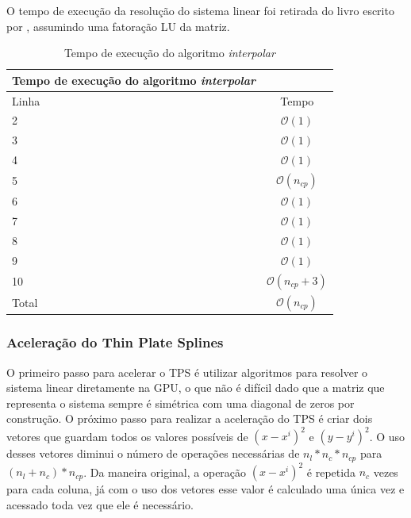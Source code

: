   O tempo de execução da resolução do sistema linear foi retirada do livro escrito por 
\cite[Part~IV]{trefethen1997numerical}, assumindo uma fatoração LU da matriz.

\begin{table}[H]
\begin{center}
\begin{tabular}{l|c}
\hline
Tempo de execução do algoritmo \textit{interpolar} \\
\hline
Linha&Tempo\\
\hline
2       &$\mathcal{O}(1)$ \\
3       &$\mathcal{O}(1)$ \\
4       &$\mathcal{O}(1)$\\
5       &$\mathcal{O}(n_{cp})$\\
6       &$\mathcal{O}(1)$\\
7       &$\mathcal{O}(1)$\\
8       &$\mathcal{O}(1)$\\
9       &$\mathcal{O}(1)$\\
10      &$\mathcal{O}(n_{cp}+3)$\\
\hline
Total   &$\mathcal{O}(n_{cp})$\\
\hline
\end{tabular}
\caption{Tempo de execução do algoritmo \textit{interpolar}}
\label{table:interpolar}
\end{center}
\end{table}

\subsubsection{Aceleração do Thin Plate Splines}

    O primeiro passo para acelerar o TPS é utilizar algoritmos para resolver o sistema linear diretamente na GPU, o que
não é difícil dado que a matriz que representa o sistema sempre é simétrica com uma diagonal de zeros por construção. O
próximo passo para realizar a aceleração do TPS é criar dois vetores que guardam todos os valores possíveis de $(x-x^i)^2$
e $(y-y^i)^2$. O uso desses vetores diminui o número de operações necessárias de $n_l*n_c*n_{cp}$ para $(n_l+n_c)*n_{cp}$.
Da maneira original, a operação $(x-x^i)^2$ é repetida $n_c$ vezes para cada coluna, já com o uso dos vetores esse valor
é calculado uma única vez e acessado toda vez que ele é necessário.
